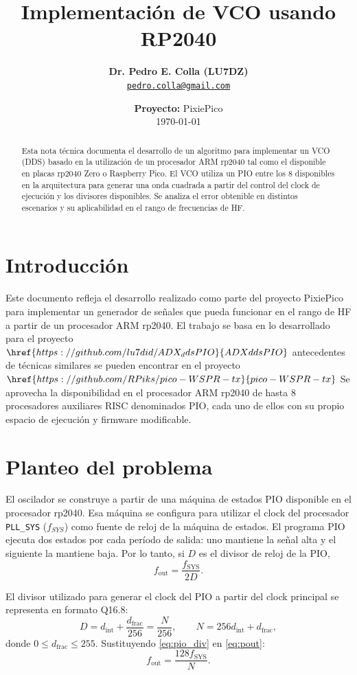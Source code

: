 \documentclass[11pt,a4paper]{article}
\title{\textbf{Implementación de VCO usando RP2040}}
\date{\textbf{Proyecto:} PixiePico \\[0.5em] \today}
\author{\textbf{Dr. Pedro E. Colla (LU7DZ)} \\ \href{mailto:pedro.colla@gmail.com}{\texttt{pedro.colla@gmail.com}}}
\begin{document}
\maketitle
\begin{abstract}
Esta nota técnica documenta el desarrollo de un algoritmo para implementar un VCO (DDS) basado en la
utilización de un procesador ARM rp2040 tal como el disponible en placas rp2040 Zero o Raspberry Pico.
El VCO utiliza un PIO entre los 8 disponibles en la arquitectura para generar una onda cuadrada a partir
del control del clock de ejecución y los divisores disponibles.
Se analiza el error obtenible en distintos escenarios y su aplicabilidad en el rango de frecuencias de HF.
\end{abstract}

\section{Introducción}

Este documento refleja el desarrollo realizado como parte del proyecto PixiePico
para implementar un generador de señales que pueda funcionar en el rango de HF
a partir de un procesador ARM rp2040.
El trabajo se basa en lo desarrollado para el proyecto $\href{https://github.com/lu7did/ADX_ddsPIO}{ADX ddsPIO}$
antecedentes de técnicas similares se pueden encontrar en el proyecto $\href{https://github.com/RPiks/pico-WSPR-tx}{pico-WSPR-tx}$
Se aprovecha la disponibilidad en el procesador ARM rp2040 de hasta 8 procesadores auxiliares RISC
denominados PIO, cada uno de ellos con su propio espacio de ejecución y firmware modificable.

\section{Planteo del problema}

El oscilador se construye a partir de una máquina de estados PIO disponible en el 
procesador rp2040. Esa máquina se configura para utilizar el clock del procesador \texttt{PLL\_SYS} ($f_{SYS}$)
como fuente de reloj de la máquina de estados. El programa PIO ejecuta dos estados por cada período de salida:
uno mantiene la señal alta y el siguiente la mantiene baja. Por lo tanto,
si \(D\) es el divisor de reloj de la PIO,
\begin{equation}
 f_{\mathrm{out}}=\frac{f_{\mathrm{SYS}}}{2D}.
 \label{eq:pout}
\end{equation}

El divisor utilizado para generar el clock del PIO a partir del clock principal se representa en formato Q16.8:
\begin{equation}
 D=d_{\mathrm{int}}+\frac{d_{\mathrm{frac}}}{256}
  =\frac{N}{256},
 \qquad
 N=256d_{\mathrm{int}}+d_{\mathrm{frac}},
 \label{eq:pio_div}
\end{equation}
donde \(0\le d_{\mathrm{frac}}\le255\). Sustituyendo
\eqref{eq:pio_div} en \eqref{eq:pout}:
\begin{equation}
 f_{\mathrm{out}}=\frac{128f_{\mathrm{SYS}}}{N}.
 \label{eq:pout_n}
\end{equation}
\end{document}
